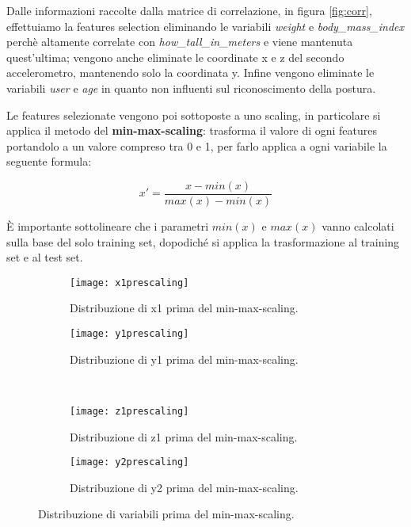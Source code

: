 Dalle informazioni raccolte dalla matrice di correlazione, in figura \ref{fig:corr}, effettuiamo la features selection eliminando le variabili \textit{weight} e \textit{body\_mass\_index} perchè altamente correlate con \textit{how\_tall\_in\_meters} e viene mantenuta quest'ultima; vengono anche eliminate le coordinate x e z del secondo accelerometro, mantenendo solo la coordinata y. Infine vengono eliminate le variabili \textit{user} e \textit{age} in quanto non influenti sul riconoscimento della postura.

Le features selezionate vengono poi sottoposte a uno scaling, in particolare si applica il metodo del \textbf{min-max-scaling}: trasforma il valore di ogni features portandolo a un valore compreso tra 0 e 1, per farlo applica a ogni variabile la seguente formula:

\begin{equation}
x' = \frac{x-min(x)}{max(x)-min(x)}
\end{equation}

È importante sottolineare che i parametri $min(x)$ e $max(x)$ vanno calcolati sulla base del solo training set, dopodiché si applica la trasformazione al training set e al test set.

\begin{figure}[ht]
    \centering
    \begin{subfigure}[t]{0.4\textwidth}
        \centering\texttt{[image: x1prescaling]}
        \caption{Distribuzione di x1 prima del min-max-scaling.}
        \label{fig:distprescaling:x1}
    \end{subfigure}
    \begin{subfigure}[t]{0.4\textwidth}
        \centering\texttt{[image: y1prescaling]}
        \caption{Distribuzione di y1 prima del min-max-scaling.}
        \label{fig:distprescaling:y1}
    \end{subfigure}
    \\
    \begin{subfigure}[t]{0.4\textwidth}
        \centering\texttt{[image: z1prescaling]}
        \caption{Distribuzione di z1 prima del min-max-scaling.}
        \label{fig:distprescaling:z1}
    \end{subfigure}
    \begin{subfigure}[t]{0.4\textwidth}
        \centering\texttt{[image: y2prescaling]}
        \caption{Distribuzione di y2 prima del min-max-scaling.}
        \label{fig:distprescaling:y2}
    \end{subfigure}
    \caption{Distribuzione di variabili prima del min-max-scaling.}
    \label{fig:distprescaling}
\end{figure}

